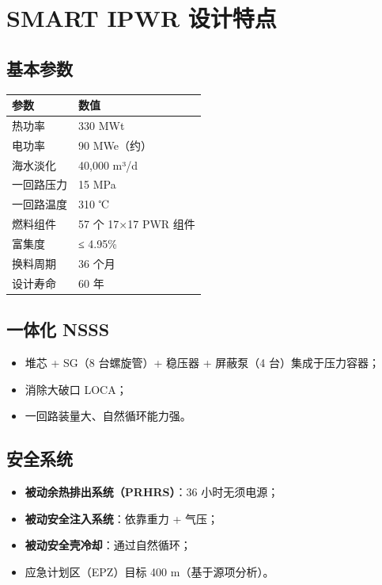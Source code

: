 \documentclass[
  UTF8,
  scheme=plain,
  fontsize=10pt,
  openany
]{ctexbook}
\begin{document}
\section{SMART IPWR 设计特点}\label{smart-ipwr-ux8bbeux8ba1ux7279ux70b9}

\subsection{基本参数}\label{ux57faux672cux53c2ux6570}

{\def\LTcaptype{none} %
\begin{longtable}[]{@{}ll@{}}
\toprule\noalign{}
参数 & 数值 \\
\midrule\noalign{}
\endhead
\bottomrule\noalign{}
\endlastfoot
热功率 & 330 MWt \\
电功率 & 90 MWe（约） \\
海水淡化 & 40,000 m³/d \\
一回路压力 & 15 MPa \\
一回路温度 & 310 ℃ \\
燃料组件 & 57 个 17×17 PWR 组件 \\
富集度 & ≤ 4.95\% \\
换料周期 & 36 个月 \\
设计寿命 & 60 年 \\
\end{longtable}
}

\subsection{一体化 NSSS}\label{ux4e00ux4f53ux5316-nsss}

\begin{itemize}
\tightlist
\item
  堆芯 + SG（8 台螺旋管）+ 稳压器 + 屏蔽泵（4 台）集成于压力容器；
\item
  消除大破口 LOCA；
\item
  一回路装量大、自然循环能力强。
\end{itemize}

\subsection{安全系统}\label{ux5b89ux5168ux7cfbux7edf}

\begin{itemize}
\tightlist
\item
  \textbf{被动余热排出系统（PRHRS）}：36 小时无须电源；
\item
  \textbf{被动安全注入系统}：依靠重力 + 气压；
\item
  \textbf{被动安全壳冷却}：通过自然循环；
\item
  应急计划区（EPZ）目标 400 m（基于源项分析）。
\end{itemize}
\end{document}
